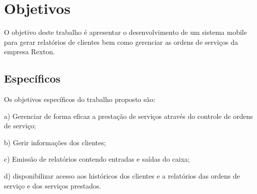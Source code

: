 \chapter{Objetivos}
O objetivo deste trabalho é apresentar o desenvolvimento de um sistema mobile para gerar relatórios de clientes bem como gerenciar as ordens de serviços da empresa Rexton.

\section{Específicos}
Os objetivos específicos do trabalho proposto são:

a) Gerenciar de forma eficaz a prestação de serviços através do controle de ordens de serviço;

b) Gerir informações dos clientes;

c) Emissão de relatórios contendo entradas e saídas do caixa;

d) disponibilizar acesso aos históricos dos clientes e a relatórios das ordens de serviço e dos serviços prestados.
